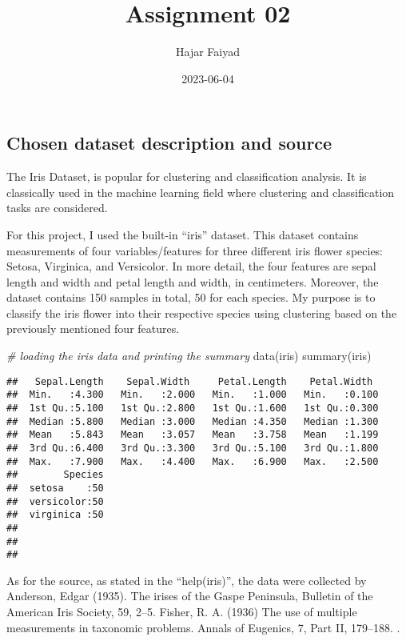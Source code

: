 \documentclass[
]{article}
\title{Assignment 02}
\author{Hajar Faiyad}
\date{2023-06-04}
\newenvironment{Shaded}{\begin{snugshade}}{\end{snugshade}}
\newcommand{\CommentTok}[1]{\textcolor[rgb]{0.56,0.35,0.01}{\textit{#1}}}
\newcommand{\FunctionTok}[1]{\textcolor[rgb]{0.00,0.00,0.00}{#1}}
\newcommand{\NormalTok}[1]{#1}
\begin{document}
\maketitle

\hypertarget{chosen-dataset-description-and-source}{%
\subsection{Chosen dataset description and
source}\label{chosen-dataset-description-and-source}}

The Iris Dataset, is popular for clustering and classification analysis.
It is classically used in the machine learning field where clustering
and classification tasks are considered.

For this project, I used the built-in ``iris'' dataset. This dataset
contains measurements of four variables/features for three different
iris flower species: Setosa, Virginica, and Versicolor. In more detail,
the four features are sepal length and width and petal length and width,
in centimeters. Moreover, the dataset contains 150 samples in total, 50
for each species. My purpose is to classify the iris flower into their
respective species using clustering based on the previously mentioned
four features.

\begin{Shaded}
\begin{Highlighting}[]
\CommentTok{\# loading the iris data and printing the summary}
\FunctionTok{data}\NormalTok{(iris)}
\FunctionTok{summary}\NormalTok{(iris)}
\end{Highlighting}
\end{Shaded}

\begin{verbatim}
##   Sepal.Length    Sepal.Width     Petal.Length    Petal.Width   
##  Min.   :4.300   Min.   :2.000   Min.   :1.000   Min.   :0.100  
##  1st Qu.:5.100   1st Qu.:2.800   1st Qu.:1.600   1st Qu.:0.300  
##  Median :5.800   Median :3.000   Median :4.350   Median :1.300  
##  Mean   :5.843   Mean   :3.057   Mean   :3.758   Mean   :1.199  
##  3rd Qu.:6.400   3rd Qu.:3.300   3rd Qu.:5.100   3rd Qu.:1.800  
##  Max.   :7.900   Max.   :4.400   Max.   :6.900   Max.   :2.500  
##        Species  
##  setosa    :50  
##  versicolor:50  
##  virginica :50  
##                 
##                 
## 
\end{verbatim}

As for the source, as stated in the ``help(iris)'', the data were
collected by Anderson, Edgar (1935). The irises of the Gaspe Peninsula,
Bulletin of the American Iris Society, 59, 2--5. Fisher, R. A. (1936)
The use of multiple measurements in taxonomic problems. Annals of
Eugenics, 7, Part II, 179--188. .
\end{document}
